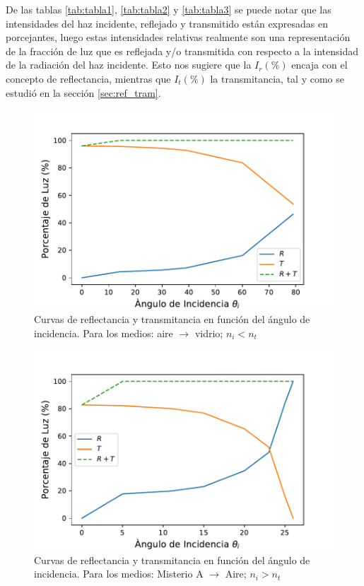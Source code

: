 \documentclass[
aps,
reprint,
amsmath, amssymb,
superscriptaddress,
]{revtex4-2}
\begin{document}
De las tablas \ref{tab:tabla1}, \ref{tab:tabla2} y \ref{tab:tabla3} se puede notar que las intensidades del haz incidente, reflejado y transmitido están expresadas en porcejantes, luego estas intensidades relativas realmente son una representación de la fracción de luz que es reflejada y/o transmitida con respecto a la intensidad de la radiación del haz incidente. Esto nos sugiere que la $I_r (\%)$ encaja con el concepto de reflectancia, mientras que $I_t (\%)$ la transmitancia, tal y como se estudió en la sección \ref{sec:ref_tram}. 

\begin{figure}
\centering
\includegraphics[width=0.9\columnwidth]{img/lab0.pdf}
\caption{\label{fig:lab0} Curvas de reflectancia y transmitancia en función del ángulo de incidencia. Para los medios: aire $\rightarrow$ vidrio; $n_i < n_t$}
\end{figure}

\begin{figure}
\centering
\includegraphics[width=0.9\columnwidth]{img/lab1.pdf}
\caption{\label{fig:lab1} Curvas de reflectancia y transmitancia en función del ángulo de incidencia. Para los medios: Misterio A $\rightarrow$ Aire; $n_i > n_t$}
\end{figure}
\end{document}
